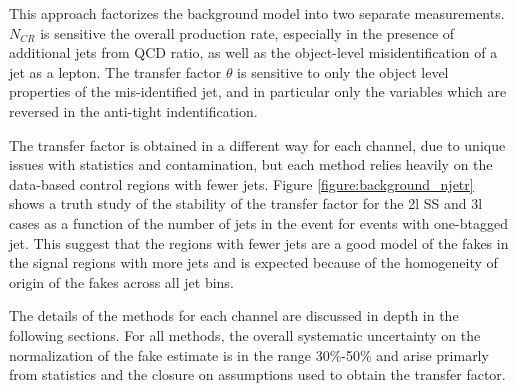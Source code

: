 This approach factorizes the background model into two separate measurements. $N_{CR}$ is sensitive the overall \ttbar production rate, especially in the presence of additional jets from QCD ratio, as well as the object-level misidentification of a jet as a lepton. The transfer factor $\theta$ is sensitive to only the object level properties of the mis-identified jet, and in particular only the variables which are reversed in the anti-tight indentification. 

The transfer factor is obtained in a different way for each channel, due to unique issues with statistics and contamination, but each method relies heavily on the data-based control regions with fewer jets. Figure \ref{figure:background_njetr} shows a truth study of the stability of the transfer factor for the 2l SS and 3l cases as a function of the number of jets in the event for events with one-btagged jet. This suggest that the regions with fewer jets are a good model of the fakes in the signal regions with more jets and is expected because of the homogeneity of origin of the fakes across all jet bins.  

The details of the methods for each channel are discussed in depth in the following sections. For all methods, the overall systematic uncertainty on the normalization of the fake estimate is in the range 30\%-50\% and arise primarly from statistics and the closure on assumptions used to obtain the transfer factor.

